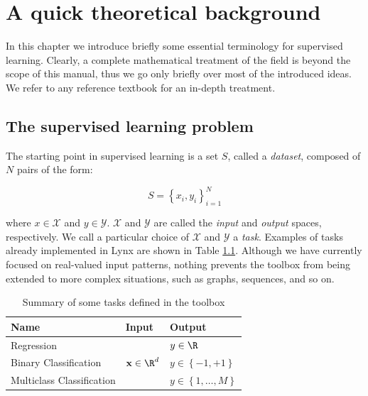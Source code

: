 \chapter{A quick theoretical background}
\label{chap:theoreticalbackground}

In this chapter we introduce briefly some essential terminology for supervised learning. Clearly, a complete mathematical treatment of the field is beyond the scope of this manual, thus we go only briefly over most of the introduced ideas. We refer to any reference textbook for an in-depth treatment.\cite{alpaydin2004introduction,Friedman2009,Mohri2012}

\section{The supervised learning problem}

The starting point in supervised learning is a set $S$, called a \textit{dataset}, composed of $N$ pairs of the form:

\begin{equation}
S = \left\{ x_i, y_i \right\}_{i=1}^N
\label{eq:dataset}
\end{equation}

\noindent where $x \in \mathcal{X}$ and $y \in \mathcal{Y}$. $\mathcal{X}$ and $\mathcal{Y}$ are called the \textit{input} and \textit{output} spaces, respectively.  We call a particular choice of $\mathcal{X}$ and $\mathcal{Y}$ a \textit{task}. Examples of tasks already implemented in Lynx are shown in Table \ref{tab:basictasks}. Although we have currently focused on real-valued input patterns, nothing prevents the toolbox from being extended to more complex situations, such as graphs, sequences, and so on.

\vspace{-2em}

\begin{center}
\begin{table}[t]
{\centering\hfill{}
\begin{tabular}{lll}
\toprule
Name & Input & Output \\ 
\midrule
Regression & \multirow{3}{*}{$\vect{x} \in \R^{d}$ } & $y \in \R$ \\
Binary Classification & & $y \in \left\{-1,+1\right\}$\\
Multiclass Classification & & $y \in \left\{1,\dots,M\right\}$\\
\bottomrule
\end{tabular}}
\hfill{}
\caption{Summary of some tasks defined in the toolbox}
\label{tab:basictasks}
\end{table}
\end{center}

